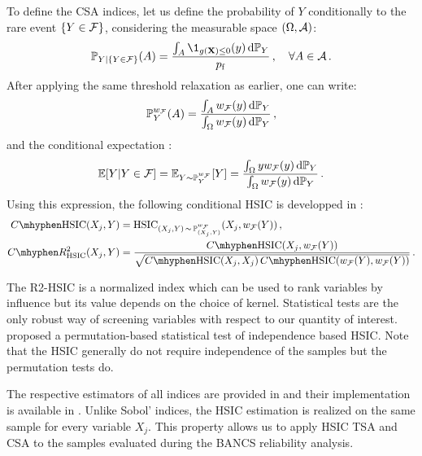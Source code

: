To define the CSA indices, let us define the probability of $Y$ conditionally to the rare event $\{Y \in \mathcal{F}\}$, considering the measurable space $(\Omega, \mathcal{A})$:
\begin{equation}
    \P_{Y|\{Y\in\iF\}}(A) = \frac{\int_{A} \1_{g(\bX)\leq0}(y) \, \dd \P_Y}{\pf}\,, \quad \forall A \in \iA\,.
\end{equation}
After applying the same threshold relaxation as earlier, one can write: 
\begin{equation}
    \mathbb{P}_Y^{w_{\mathcal{F}}}(A)= \frac{\int_A w_{\mathcal{F}}(y) \, \mathrm{d} \mathbb{P}_Y}{\int_{\Omega} w_{\mathcal{F}}(y) \, \mathrm{d} \mathbb{P}_Y} \, ,
\end{equation}
and the conditional expectation : 
\begin{equation}
    \mathbb{E}[Y|Y \in \mathcal{F}] = \mathbb{E}_{Y\sim\mathbb{P}_Y^{w_{\mathcal{F}}}}[Y] = \frac{\int_\Omega y w_{\mathcal{F}}(y) \, \mathrm{d} \mathbb{P}_Y}{\int_{\Omega} w_{\mathcal{F}}(y) \, \mathrm{d} \mathbb{P}_Y}\, .
\end{equation}
Using this expression, the following conditional HSIC is developped in \citet{marrel_chabridon_2021}:
\begin{subequations}
    \begin{align}
        C \mhyphen \HSIC(X_j, Y) & = \HSIC_{(X_j, Y) \,\sim\, \P_{(X_j, Y)}^{w_{\iF}}} (X_j, w_{\iF}(Y)) \, ,\\
        C \mhyphen R^2_{\HSIC}(X_j, Y) &= \frac{C \mhyphen \HSIC(X_j, w_{\iF}(Y))}{\sqrt{C \mhyphen \HSIC(X_j, X_j) \, C \mhyphen \HSIC(w_{\iF}(Y), w_{\iF}(Y))}}\, .
    \end{align}
\end{subequations}

The R2-HSIC is a normalized index which can be used to rank variables by influence but its value depends on the choice of kernel. 
Statistical tests are the only robust way of screening variables with respect to our quantity of interest.
\citet{delozzo_2016_hsic_test} proposed a permutation-based statistical test of independence based HSIC. 
Note that the HSIC generally do not require independence of the samples but the permutation tests do. 

The respective estimators of all indices are provided in \citet{marrel_chabridon_2021} and their implementation is available in \ot.
Unlike Sobol' indices, the HSIC estimation is realized on the same sample for every variable $X_j$. 
This property allows us to apply HSIC TSA and CSA to the samples evaluated during the BANCS reliability analysis.


